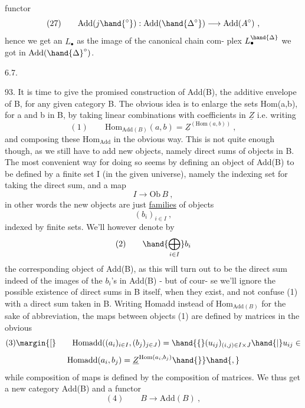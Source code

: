 
functor
\[ (27) \qquad \mathrm{Add}(j\hand{{}^{\circ}}) : \mathrm{Add}(\hand{\Delta^{\circ}}) \longrightarrow \mathrm{Add}(A^{\circ}) \ , \]
hence we get an $L_{\bullet}$ as the  image of the canonical chain com-%
plex $L_{\bullet}^{\hand{\Delta}}$ we got in $\mathrm{Add}(\hand{\Delta}^{\circ})$.

6.7.

93. It is time to give the promised construction of Add(B), 
 the additive envelope of B, for any given category B.
The obvious idea is to enlarge the sets Hom(a,b), for a and b in B,
by taking linear combinations with coefficients in $\underline{Z}$ i.e. writing
\[ (1) \qquad \mathrm{Hom}_{\mathrm{Add}(B)}(a,b) = \underline{Z}^{(\mathrm{Hom}(a,b))} \ , \]
and composing these $\mathrm{Hom}_{\mathrm{Add}}$ in the obvious way. This is not quite
enough though, as we still have to add new objects, namely direct sums
of objects in B. The most convenient way for doing so seems by defining
an object of Add(B) to be defined by a finite set I (in the given
universe), namely the indexing set for taking the direct sum, and
a map
\[ I \longrightarrow \mathrm{Ob}\, B \ , \]
in other words the new objects are just \uline{families} of objects  
\[ (b_i)_{i\in I} \ , \]
 indexed by finite sets. We'll however denote by
\[ (2) \qquad \hand{\bigoplus_{i\in I}} b_i \]
the corresponding object of Add(B), as this will turn out to be the
direct sum indeed of the images of the $b_i$'s in Add(B) - but of cour-%
se we'll ignore the possible existence of direct sums in B  itself,
when they exist, and not confuse (1) with a direct sum taken in B.
Writing Homadd instead of $\mathrm{Hom}_{\mathrm{Add}(B)}$ for the sake of abbreviation,
the maps between objects (1) are defined by matrices in the obvious 
\[ (3) \margin{[} \qquad \mathrm{Homadd}((a_i)_{i\in I},(b_j)_{j\in J}) = \hand{\{}(u_{ij})_{(i,j)\in I\times J} \hand{\mid} u_{ij} \in \]
\[ \mathrm{Homadd}(a_i,b_j) = \underline{Z}^{\mathrm{Hom}(a_i,b_j)}\hand{\}} \hand{,} \]
while composition of maps is defined by the composition of matrices.
We thus get a new category Add(B) and a functor
\[ (4) \qquad B \longrightarrow \mathrm{Add}(B) \ , \]


